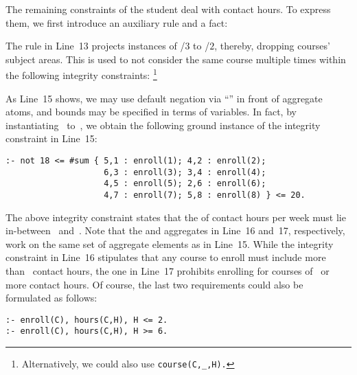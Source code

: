 \begin{example}
The remaining constraints of the student deal with contact hours.
To express them, we first introduce an auxiliary rule and a fact:
%

%
The rule in Line~13 projects instances of /$3$ to
/$2$, thereby, dropping courses' subject areas.
This is used to not consider the same course multiple times within the following
integrity constraints:
\footnote{Alternatively, we could also use \lstinline{course(C,_,H).}}
%

%
As Line~15 shows,
we may use default negation via ``'' in front of aggregate atoms,
and bounds may be specified in terms of variables.
In fact, by instantiating~ to~,
we obtain the following ground instance of the integrity constraint in Line~15:
%
\begin{lstlisting}[firstnumber=15,stepnumber=15]
:- not 18 <= #sum { 5,1 : enroll(1); 4,2 : enroll(2);
                    6,3 : enroll(3); 3,4 : enroll(4);
                    4,5 : enroll(5); 2,6 : enroll(6);
                    4,7 : enroll(7); 5,8 : enroll(8) } <= 20.
\end{lstlisting}
%
The above integrity constraint states that the  of contact hours per week
must lie in-between~ and~.
Note that the  and  aggregates in Line~16 and~17, respectively,
work on the same set of aggregate elements as in Line~15.
While the integrity constraint in Line~16 stipulates that any course to enroll
must include more than~ contact hours,
the one in Line~17 prohibits enrolling for courses of~ or more contact hours.
Of course, the last two requirements could also be formulated as follows:
%
\begin{lstlisting}[firstnumber=16]
:- enroll(C), hours(C,H), H <= 2.
:- enroll(C), hours(C,H), H >= 6.
\end{lstlisting}


\end{example}
